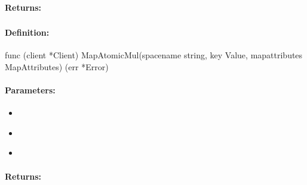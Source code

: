\paragraph{Returns:}


\pagebreak
\subsubsection{}
\label{api:Go:MapAtomicMul}


\paragraph{Definition:}
\begin{gocode}
func (client *Client) MapAtomicMul(spacename string, key Value, mapattributes MapAttributes) (err *Error)
\end{gocode}

\paragraph{Parameters:}
\begin{itemize}[noitemsep]
\item {}\\

\item {}\\

\item {}\\

\end{itemize}

\paragraph{Returns:}


\pagebreak
\subsubsection{}
\label{api:Go:CondMapAtomicMul}


